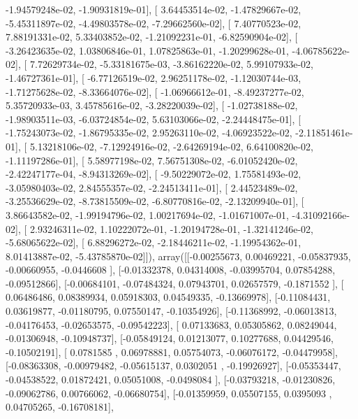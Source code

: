 \documentclass{article}
\begin{document}
         -1.94579248e-02,  -1.90931819e-01],
       [  3.64453514e-02,  -1.47829667e-02,  -5.45311897e-02,
         -4.49803578e-02,  -7.29662560e-02],
       [  7.40770523e-02,   7.88191331e-02,   5.33403852e-02,
         -1.21092231e-01,  -6.82590904e-02],
       [ -3.26423635e-02,   1.03806846e-01,   1.07825863e-01,
         -1.20299628e-01,  -4.06785622e-02],
       [  7.72629734e-02,  -5.33181675e-03,  -3.86162220e-02,
          5.99107933e-02,  -1.46727361e-01],
       [ -6.77126519e-02,   2.96251178e-02,  -1.12030744e-03,
         -1.71275628e-02,  -8.33664076e-02],
       [ -1.06966612e-01,  -8.49237277e-02,   5.35720933e-03,
          3.45785616e-02,  -3.28220039e-02],
       [ -1.02738188e-02,  -1.98903511e-03,  -6.03724854e-02,
          5.63103066e-02,  -2.24448475e-01],
       [ -1.75243073e-02,  -1.86795335e-02,   2.95263110e-02,
         -4.06923522e-02,  -2.11851461e-01],
       [  5.13218106e-02,  -7.12924916e-02,  -2.64269194e-02,
          6.64100820e-02,  -1.11197286e-01],
       [  5.58977198e-02,   7.56751308e-02,  -6.01052420e-02,
         -2.42247177e-04,  -8.94313269e-02],
       [ -9.50229072e-02,   1.75581493e-02,  -3.05980403e-02,
          2.84555357e-02,  -2.24513411e-01],
       [  2.44523489e-02,  -3.25536629e-02,  -8.73815509e-02,
         -6.80770816e-02,  -2.13209940e-01],
       [  3.86643582e-02,  -1.99194796e-02,   1.00217694e-02,
         -1.01671007e-01,  -4.31092166e-02],
       [  2.93246311e-02,   1.10222072e-01,  -1.20194728e-01,
         -1.32141246e-02,  -5.68065622e-02],
       [  6.88296272e-02,  -2.18446211e-02,  -1.19954362e-01,
          8.01413887e-02,  -5.43785870e-02]]), array([[-0.00255673,  0.00469221, -0.05837935, -0.00660955, -0.0446608 ],
       [-0.01332378,  0.04314008, -0.03995704,  0.07854288, -0.09512866],
       [-0.00684101, -0.07484324,  0.07943701,  0.02657579, -0.1871552 ],
       [ 0.06486486,  0.08389934,  0.05918303,  0.04549335, -0.13669978],
       [-0.11084431,  0.03619877, -0.01180795,  0.07550147, -0.10354926],
       [-0.11368992, -0.06013813, -0.04176453, -0.02653575, -0.09542223],
       [ 0.07133683,  0.05305862,  0.08249044, -0.01306948, -0.10948737],
       [-0.05849124,  0.01213077,  0.10277688,  0.04429546, -0.10502191],
       [ 0.0781585 ,  0.06978881,  0.05754073, -0.06076172, -0.04479958],
       [-0.08363308, -0.00979482, -0.05615137,  0.0302051 , -0.19926927],
       [-0.05353447, -0.04538522,  0.01872421,  0.05051008, -0.0498084 ],
       [-0.03793218, -0.01230826, -0.09062786,  0.00766062, -0.06680754],
       [-0.01359959,  0.05507155,  0.0395093 ,  0.04705265, -0.16708181],
\end{document}
